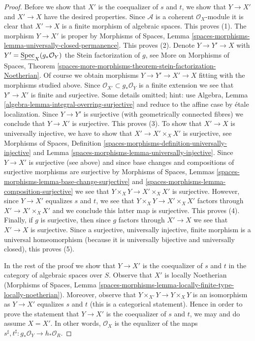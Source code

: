 \begin{proof}
\medskip\noindent
Before we show that $X'$ is the coequalizer of $s$ and $t$, we show
that $Y \to X'$ and $X' \to X$ have the desired properties. Since $\mathcal{A}$
is a coherent $\mathcal{O}_X$-module it is clear that $X' \to X$ is a
finite morphism of algebraic spaces. This proves (1).
The morphism $Y \to X'$ is proper by Morphisms of Spaces, Lemma
\ref{spaces-morphisms-lemma-universally-closed-permanence}. This proves (2).
Denote $Y \to Y' \to X$ with
$Y' = \underline{\operatorname{Spec}}_X(g_*\mathcal{O}_Y)$ the Stein factorization of $g$,
see More on Morphisms of Spaces, Theorem
\ref{spaces-more-morphisms-theorem-stein-factorization-Noetherian}.
Of course we obtain morphisms $Y \to Y' \to X' \to X$ fitting
with the morphisms studied above.
Since $\mathcal{O}_{X'} \subset g_*\mathcal{O}_Y$ is a finite extension
we see that $Y' \to X'$ is finite and surjective.
Some details omitted; hint: use
Algebra, Lemma \ref{algebra-lemma-integral-overring-surjective}
and reduce to the affine case by \'etale localization.
Since $Y \to Y'$ is surjective (with geometrically connected fibres)
we conclude that $Y \to X'$ is surjective. This proves (3).
To show that $X' \to X$ is universally injective, we have to show
that $X' \to X' \times_X X'$ is surjective, see
Morphisms of Spaces, Definition
\ref{spaces-morphisms-definition-universally-injective} and
Lemma \ref{spaces-morphisms-lemma-universally-injective}.
Since $Y \to X'$ is surjective (see above) and since base changes
and compositions of surjective morphisms are surjective by
Morphisms of Spaces, Lemmas
\ref{spaces-morphisms-lemma-base-change-surjective} and
\ref{spaces-morphisms-lemma-composition-surjective}
we see that $Y \times_X Y \to X' \times_X X'$ is surjective.
However, since $Y \to X'$ equalizes $s$ and $t$, we see that
$Y \times_X Y \to X' \times_X X'$ factors through $X' \to X' \times_X X'$
and we conclude this latter map is surjective. This proves (4).
Finally, if $g$ is surjective, then since $g$ factors through $X' \to X$
we see that $X' \to X$ is surjective. Since a surjective, universally
injective, finite morphism is a universal homeomorphism (because it
is universally bijective and universally closed), this proves (5).

\medskip\noindent
In the rest of the proof we show that $Y \to X'$ is the coequalizer
of $s$ and $t$ in the category of algebraic spaces over $S$.
Observe that $X'$ is locally Noetherian
(Morphisms of Spaces, Lemma
\ref{spaces-morphisms-lemma-locally-finite-type-locally-noetherian}).
Moreover, observe that $Y \times_{X'} Y \to Y \times_X Y$ is an
isomorphism as $Y \to X'$ equalizes $s$ and $t$ (this is a categorical
statement). Hence in order to prove the statement that $Y \to X'$
is the coequalizer of $s$ and $t$, we may and do assume $X = X'$.
In other words, $\mathcal{O}_X$ is the equalizer of the maps
$s^\sharp, t^\sharp : g_*\mathcal{O}_Y \to h_*\mathcal{O}_R$.


\end{proof}
